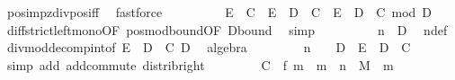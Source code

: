 \begin{isabellebody}
\ pos{\isacharunderscore}{\kern0pt}imp{\isacharunderscore}{\kern0pt}zdiv{\isacharunderscore}{\kern0pt}pos{\isacharunderscore}{\kern0pt}iff\ \isamarkupfalse%
\ fastforce\isanewline
\ \ \ \isanewline
\ \ \ \ \isamarkupfalse%
\ {\isachardoublequoteopen}E\ {\isacharplus}{\kern0pt}\ C\ {\isacharless}{\kern0pt}\ E\ {\isacharplus}{\kern0pt}\ D\ {\isacharplus}{\kern0pt}\ C\ {\isacharminus}{\kern0pt}\ {\isacharparenleft}{\kern0pt}E\ {\isacharplus}{\kern0pt}\ D\ {\isacharplus}{\kern0pt}\ C{\isacharparenright}{\kern0pt}\ mod\ D{\isachardoublequoteclose}\ \isamarkupfalse%
\ diff{\isacharunderscore}{\kern0pt}strict{\isacharunderscore}{\kern0pt}left{\isacharunderscore}{\kern0pt}mono{\isacharbrackleft}{\kern0pt}OF\ pos{\isacharunderscore}{\kern0pt}mod{\isacharunderscore}{\kern0pt}bound{\isacharbrackleft}{\kern0pt}OF\ D{\isacharunderscore}{\kern0pt}bound{\isacharparenleft}{\kern0pt}{}{\isacharparenright}{\kern0pt}{\isacharbrackright}{\kern0pt}{\isacharbrackright}{\kern0pt}\ \isamarkupfalse%
\ simp\isanewline
\ \ \ \ \isamarkupfalse%
\ \isamarkupfalse%
\ {\isachardoublequoteopen}{\isachardot}{\kern0pt}{\isachardot}{\kern0pt}{\isachardot}{\kern0pt}\ {\isacharequal}{\kern0pt}\ n\ {\isacharasterisk}{\kern0pt}\ D{\isachardoublequoteclose}\ \isamarkupfalse%
\ n{\isacharunderscore}{\kern0pt}def\ \isamarkupfalse%
\ div{\isacharunderscore}{\kern0pt}mod{\isacharunderscore}{\kern0pt}decomp{\isacharunderscore}{\kern0pt}int{\isacharbrackleft}{\kern0pt}of\ {\isachardoublequoteopen}E\ {\isacharplus}{\kern0pt}\ D\ {\isacharplus}{\kern0pt}\ C{\isachardoublequoteclose}\ D{\isacharbrackright}{\kern0pt}\ \isamarkupfalse%
\ algebra\isanewline
\ \ \ \ \isamarkupfalse%
\ \isamarkupfalse%
\ {\isacharasterisk}{\kern0pt}{\isacharcolon}{\kern0pt}\ {\isachardoublequoteopen}{\isacharparenleft}{\kern0pt}n\ {\isacharplus}{\kern0pt}\ {}{\isacharparenright}{\kern0pt}\ {\isacharasterisk}{\kern0pt}\ D\ {\isachargreater}{\kern0pt}\ E\ {\isacharplus}{\kern0pt}\ D\ {\isacharplus}{\kern0pt}\ C{\isachardoublequoteclose}\ \isamarkupfalse%
\ {\isacharparenleft}{\kern0pt}simp\ add{\isacharcolon}{\kern0pt}\ add{\isachardot}{\kern0pt}commute\ distrib{\isacharunderscore}{\kern0pt}right{\isacharparenright}{\kern0pt}\isanewline
\ \ \isanewline
\ \ \ \ \isamarkupfalse%
\ {\isachardoublequoteopen}C\ {\isasymle}\ f\ m{\isachardoublequoteclose}\ \ {\isachardoublequoteopen}m\ {\isasymge}\ n\ {\isacharasterisk}{\kern0pt}\ M{\isachardoublequoteclose}\ \ m\isanewline

\end{isabellebody}
